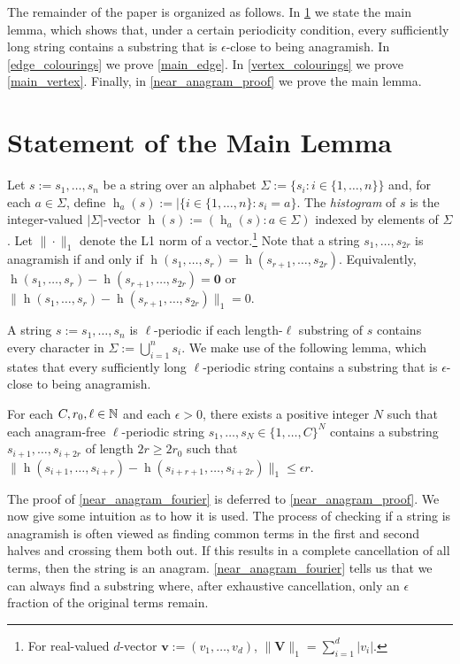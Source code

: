 \documentclass{patmorin}
\DeclareMathOperator{\hist}{h}
\begin{document}
The remainder of the paper is organized as follows.  In \cref{near_anagram_statement} we state the main lemma, which shows that, under a certain periodicity condition, every sufficiently long string contains a substring that is $\epsilon$-close to being anagramish.  In \cref{edge_colourings} we prove \cref{main_edge}.  In \cref{vertex_colourings} we prove \cref{main_vertex}.  Finally, in \cref{near_anagram_proof} we prove the main lemma.

\section{Statement of the Main Lemma}
\label{near_anagram_statement}

Let $s:=s_1,\ldots,s_n$ be a string over an alphabet $\Sigma:=\{s_i:i\in\{1,\ldots,n\}\}$ and, for each $a\in \Sigma$, define $\hist_a(s):=|\{i\in\{1,\ldots,n\}:s_i=a\}$.  The \emph{histogram} of $s$ is the integer-valued $|\Sigma|$-vector $\hist(s):=(\hist_a(s):a\in\Sigma)$ indexed by elements of $\Sigma$.  Let $\|\cdot\|_1$ denote the L1 norm of a vector.\footnote{For real-valued $d$-vector $\boldsymbol{v}:=(v_1,\ldots,v_d)$, $\|\boldsymbol{V}\|_1=\sum_{i=1}^d|v_i|$.}  Note that a string $s_1,\ldots,s_{2r}$ is anagramish if and only if $\hist(s_1,\ldots,s_r)=\hist(s_{r+1},\ldots,s_{2r})$.  Equivalently, $\hist(s_1,\ldots,s_r)-\hist(s_{r+1},\ldots,s_{2r})=\boldsymbol{0}$ or
$\|\hist(s_1,\ldots,s_r)-\hist(s_{r+1},\ldots,s_{2r})\|_1=0$.

A string $s:=s_1,\ldots,s_n$ is $\ell$-periodic if each length-$\ell$ substring of $s$ contains every character in $\Sigma:=\bigcup_{i=1}^n s_i$.  We make use of the following lemma, which states that every sufficiently long $\ell$-periodic string contains a substring that is $\epsilon$-close to being anagramish.

\begin{lem}\label{near_anagram_fourier}
    For each $C,r_0,\ell\in\mathbb{N}$ and each $\epsilon>0$, there exists a positive integer $N$ such that each anagram-free $\ell$-periodic string $s_1,\ldots,s_N\in\{1,\ldots,C\}^N$ contains a substring $s_{i+1},\ldots,s_{i+2r}$ of length $2r \ge 2r_0$ such that $\|\hist(s_{i+1},\ldots,s_{i+r})-\hist(s_{i+r+1},\ldots,s_{i+2r})\|_1 \le \epsilon r$.
\end{lem}

The proof of \cref{near_anagram_fourier} is deferred to \cref{near_anagram_proof}.  We now give some intuition as to how it is used.  The process of checking if a string is anagramish is often viewed as finding common terms in the first and second halves and crossing them both out.  If this results in a complete cancellation of all terms, then the string is an anagram.  \cref{near_anagram_fourier} tells us that we can always find a substring where, after exhaustive cancellation, only an $\epsilon$ fraction of the original terms remain.
\end{document}
